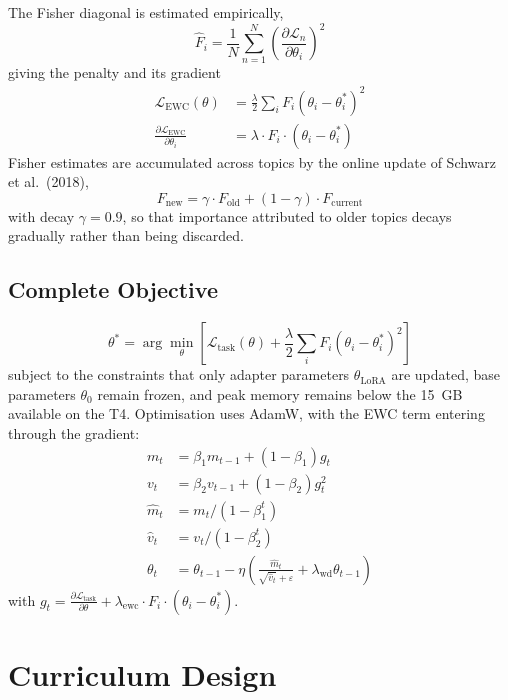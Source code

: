 \documentclass[12pt,a4paper]{report}
\begin{document}
The Fisher diagonal is estimated empirically,
\begin{equation}
\hat{F}_i = \frac{1}{N} \sum_{n=1}^{N} \left(\frac{\partial \mathcal{L}_n}{\partial \theta_i}\right)^2
\end{equation}
giving the penalty and its gradient
\begin{align}
\mathcal{L}_{\text{EWC}}(\theta) &= \frac{\lambda}{2} \sum_i F_i (\theta_i - \theta^*_i)^2 \\
\frac{\partial \mathcal{L}_{\text{EWC}}}{\partial \theta_i} &= \lambda \cdot F_i \cdot (\theta_i - \theta^*_i)
\end{align}
Fisher estimates are accumulated across topics by the online update of Schwarz et al.~(2018),
\begin{equation}
F_{\text{new}} = \gamma \cdot F_{\text{old}} + (1 - \gamma) \cdot F_{\text{current}}
\end{equation}
with decay $\gamma = 0.9$, so that importance attributed to older topics decays gradually rather than being discarded.

\subsection{Complete Objective}

\begin{equation}
\theta^* = \arg\min_\theta \left[ \mathcal{L}_{\text{task}}(\theta) + \frac{\lambda}{2} \sum_i F_i (\theta_i - \theta^*_i)^2 \right]
\end{equation}
subject to the constraints that only adapter parameters $\theta_{\text{LoRA}}$ are updated, base parameters $\theta_0$ remain frozen, and peak memory remains below the 15~GB available on the T4. Optimisation uses AdamW, with the EWC term entering through the gradient:
\begin{align}
m_t &= \beta_1 m_{t-1} + (1 - \beta_1) g_t \\
v_t &= \beta_2 v_{t-1} + (1 - \beta_2) g_t^2 \\
\hat{m}_t &= m_t / (1 - \beta_1^t) \\
\hat{v}_t &= v_t / (1 - \beta_2^t) \\
\theta_t &= \theta_{t-1} - \eta \left( \frac{\hat{m}_t}{\sqrt{\hat{v}_t} + \varepsilon} + \lambda_{\text{wd}} \theta_{t-1} \right)
\end{align}
with $g_t = \frac{\partial \mathcal{L}_{\text{task}}}{\partial \theta} + \lambda_{\text{ewc}} \cdot F_i \cdot (\theta_i - \theta^*_i)$.

\section{Curriculum Design}
\end{document}
